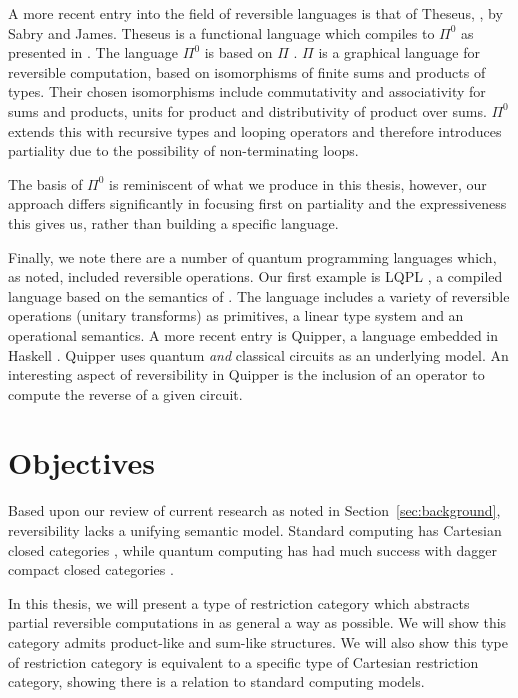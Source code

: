 A more recent entry into the field of reversible languages is that of Theseus,
\cite{james2014theseus}, by Sabry and James. Theseus is a functional language which compiles to
$\Pi^0$ as presented in \cite{james2013isomorphic}. The language $\Pi^0$ is based on $\Pi$
\cite{james2012information}.  $\Pi$ is a graphical language for reversible computation, based on
isomorphisms of finite sums and products of types. Their chosen isomorphisms include commutativity
and associativity for sums and products, units for product and distributivity of product over
sums. $\Pi^0$ extends this with recursive types and looping operators and therefore introduces partiality
due to the possibility of non-terminating loops.

The basis of $\Pi^0$ is reminiscent of what we produce in this thesis, however, our approach differs
significantly in focusing first on partiality and the expressiveness this gives us, rather than
building a specific language.


Finally, we note there are a number of quantum programming languages which, as noted, included
reversible operations. Our first example is LQPL \cite{giles2007}, a compiled language based on the
semantics of \cite{selinger04:qpl}. The language includes a variety of reversible operations
(unitary transforms) as primitives, a linear type system and an operational semantics. A more recent
entry is Quipper, \cite{green2013introduction,green2013quipper} a language embedded in Haskell
\cite{peyton2003:haskell98}. Quipper uses quantum \emph{and} classical circuits as an underlying
model. An interesting aspect of reversibility in Quipper is the inclusion of an operator to compute
the reverse of a given circuit.

\section{Objectives}
\label{sec:objectives}

Based upon our review of current research as noted in Section~\ref{sec:background}, reversibility
lacks a unifying semantic model. Standard computing has Cartesian closed categories
\cite{barr:ctcs}, while quantum computing has had much success with dagger compact closed categories
\cite{selinger04:towardssemantics,selinger05:dagger,abramsky05:abstractscalars}.

In this thesis, we will present a type of restriction category which abstracts partial reversible
computations in as general a way as possible. We will show this category admits product-like and
sum-like structures. We will also show this type of restriction category is equivalent to a specific
type of Cartesian restriction category, showing there is a relation to standard computing models.

